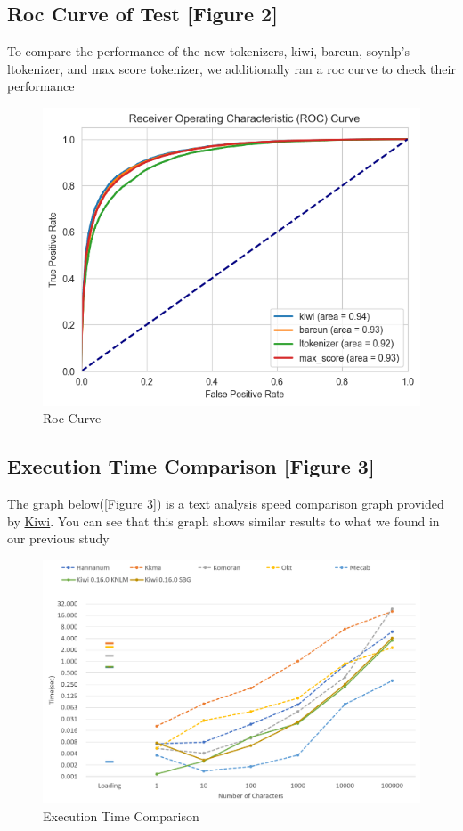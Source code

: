 \documentclass{article}
\begin{document}
\subsection{Roc Curve of Test [Figure 2]}
To compare the performance of the new tokenizers, kiwi, bareun, soynlp's ltokenizer, and max score tokenizer, we additionally ran a roc curve to check their performance
\begin{figure}
    \centering
    \includegraphics[width=0.6\linewidth]{roc_curve.png}
    \caption{Roc Curve}
    \label{fig:enter-label}
\end{figure}

\subsection{Execution Time Comparison [Figure 3]}
The graph below([Figure 3]) is a text analysis speed comparison graph provided by \href{https://github.com/bab2min/Kiwi?tab=readme-ov-file}{Kiwi}. You can see that this graph shows similar results to what we found in our previous study

\begin{figure}
    \centering
    \includegraphics[width=0.6\linewidth]{compare_speed.png}
    \caption{Execution Time Comparison}
    \label{fig:enter-label}
\end{figure}
\end{document}
